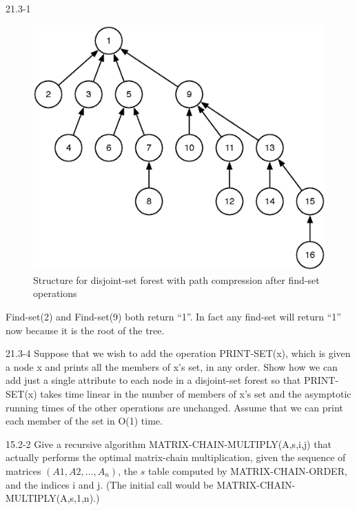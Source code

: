 \begin{problem}{21.3-1}
\begin{solution}
\begin{figure}[H]
    \end{figure}
    \begin{figure}[H]
      \centering
      \caption{Structure for disjoint-set forest with path compression after find-set operations}
      \includegraphics[scale=.5]{21_3_1_4.eps}
    \end{figure}
    Find-set(2) and Find-set(9) both return ``1''. In fact any find-set will return ``1'' now because it is the root of
    the tree.
  \end{solution}
\end{problem}

\begin{problem}{21.3-4}
  Suppose that we wish to add the operation PRINT-SET(x), which is given a node x and prints all the members of x's set,
  in any order. Show how we can add just a single attribute to each node in a disjoint-set forest so that PRINT-SET(x)
  takes time linear in the number of members of x's set and the asymptotic running times of the other operations are
  unchanged. Assume that we can print each member of the set in O(1) time.
\end{problem}

\begin{problem}{15.2-2}
  Give a recursive algorithm MATRIX-CHAIN-MULTIPLY(A,s,i,j) that actually performs the optimal matrix-chain
  multiplication, given the sequence of matrices $(A1, A2, \ldots, A_n)$, the $s$ table computed by MATRIX-CHAIN-ORDER, and
  the indices i and j. (The initial call would be MATRIX-CHAIN-MULTIPLY(A,s,1,n).)
\end{problem}

